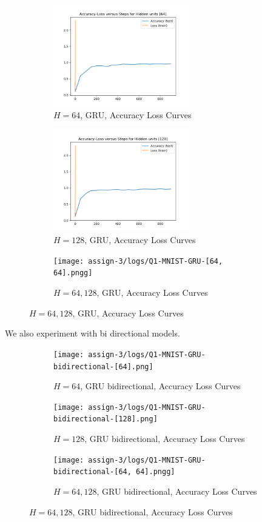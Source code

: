 \begin{figure}[!htbp]
\begin{subfigure}
\centering
\includegraphics[angle=0,width=0.65\textwidth]{assign-3/logs/Q1-MNIST-GRU-[64].png}
\caption{$H=64$, GRU, Accuracy Loss Curves}
\end{subfigure}
\begin{subfigure}
\centering
\includegraphics[angle=0,width=0.65\textwidth]{assign-3/logs/Q1-MNIST-GRU-[128].png}
\caption{$H=128$, GRU, Accuracy Loss Curves}
\end{subfigure}
\begin{subfigure}
\centering
\texttt{[image: assign-3/logs/Q1-MNIST-GRU-[64, 64].pngg]}
\caption{$H=64, 128$, GRU, Accuracy Loss Curves}
\end{subfigure}
\end{figure}

We also experiment with bi directional models.

\begin{figure}[!htbp]
\begin{subfigure}
\centering
\texttt{[image: assign-3/logs/Q1-MNIST-GRU-bidirectional-[64].png]}
\caption{$H=64$, GRU bidirectional, Accuracy Loss Curves}
\end{subfigure}
\begin{subfigure}
\centering
\texttt{[image: assign-3/logs/Q1-MNIST-GRU-bidirectional-[128].png]}
\caption{$H=128$, GRU bidirectional, Accuracy Loss Curves}
\end{subfigure}
\begin{subfigure}
\centering
\texttt{[image: assign-3/logs/Q1-MNIST-GRU-bidirectional-[64, 64].pngg]}
\caption{$H=64, 128$, GRU bidirectional, Accuracy Loss Curves}
\end{subfigure}
\end{figure}

